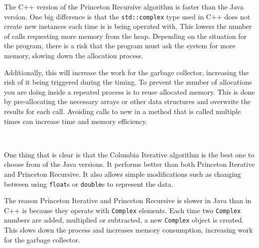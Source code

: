 The C++ version of the Princeton Recursive algorithm is faster than the Java version. One big difference is that the \texttt{std::complex} type used in C++ does not create new instances each time is is being operated with. This lowers the number of calls requesting more memory from the heap. Depending on the situation for the program, there is a risk that the program must ask the system for more memory, slowing down the allocation process.

Additionally, this will increase the work for the garbage collector, increasing the risk of it being triggered during the timing. To prevent the number of allocations you are doing inside a repeated process is to reuse allocated memory. This is done by pre-allocating the necessary arrays or other data structures and overwrite the results for each call. Avoiding calls to new in a method that is called multiple times can increase time and memory efficiency.



\\

One thing that is clear is that the Columbia Iterative algorithm is the best one to choose from of the Java versions. It performs better than both Princeton Iterative and Princeton Recursive. It also allows simple modifications such as changing between using \texttt{float}s or  \texttt{double}s to represent the data.

The reason Princeton Iterative and Princeton Recursive is slower in Java than in C++ is because they operate with \texttt{Complex} elements. Each time two \texttt{Complex} numbers are added, multiplied or subtracted, a new \texttt{Complex} object is created. This slows down the process and increases memory consumption, increasing work for the garbage collector.


\\

